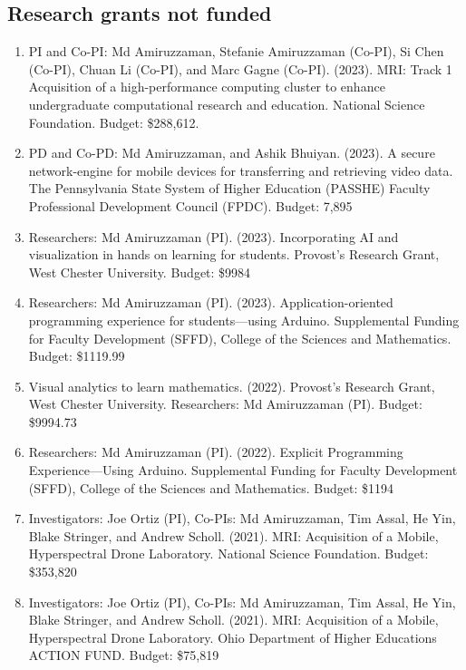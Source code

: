 \documentclass{article}
\begin{document}
\subsection*{Research grants not funded }\vspace{-0.5em}
\begin{enumerate}[topsep=0pt,itemsep=-1ex,partopsep=0ex,parsep=1ex]
    \item PI and Co-PI: Md Amiruzzaman, Stefanie Amiruzzaman (Co-PI), Si Chen (Co-PI), Chuan Li (Co-PI), and Marc Gagne (Co-PI). (2023). MRI: Track 1 Acquisition of a high-performance computing cluster to enhance undergraduate computational research and 	education. National Science Foundation. Budget: \$288,612.
    \item PD and Co-PD: Md Amiruzzaman, and Ashik Bhuiyan. (2023). A secure network-engine for 	mobile devices for transferring and retrieving video data. The Pennsylvania State System 	of Higher Education (PASSHE) Faculty Professional Development Council (FPDC). Budget: 7,895
    \item Researchers: Md Amiruzzaman (PI). (2023). Incorporating AI and visualization in hands on learning for students. Provost’s Research Grant, West Chester University.	Budget: \$9984
    \item Researchers: Md Amiruzzaman (PI). (2023). Application-oriented programming experience for 	students—using Arduino. Supplemental Funding for Faculty Development (SFFD), College of the Sciences and Mathematics. Budget: \$1119.99
    \item Visual analytics to learn mathematics. (2022). Provost’s Research Grant, West Chester University. Researchers: Md Amiruzzaman (PI). Budget: \$9994.73
    \item Researchers: Md Amiruzzaman (PI). (2022). Explicit Programming Experience—Using Arduino. Supplemental Funding for Faculty Development (SFFD), College of the 	Sciences and Mathematics. Budget: \$1194
    \item Investigators: Joe Ortiz (PI), Co-PIs: Md Amiruzzaman, Tim Assal, He Yin, Blake Stringer, and Andrew Scholl. (2021). MRI: Acquisition of a Mobile, Hyperspectral Drone	Laboratory. National Science Foundation. Budget: \$353,820
    \item Investigators: Joe Ortiz (PI), Co-PIs: Md Amiruzzaman, Tim Assal, He Yin, Blake Stringer, and Andrew Scholl. (2021). MRI: Acquisition of a Mobile, Hyperspectral Drone Laboratory. Ohio Department of Higher Educations ACTION FUND. Budget: \$75,819

\end{enumerate}
\end{document}
